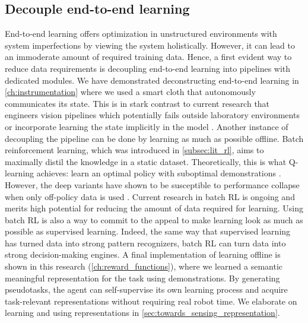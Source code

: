 \documentclass[\home/main.tex]{subfiles}
\begin{document}
\subsection{Decouple end-to-end learning}
End-to-end learning offers optimization in unstructured environments with system imperfections by viewing the system holistically. However, it can lead to an immoderate amount of required training data. Hence, a first evident way to reduce data requirements is decoupling end-to-end learning into pipelines with dedicated modules. 
We have demonstrated deconstructing end-to-end learning in \cref{ch:instrumentation} where we used a smart cloth that autonomously communicates its state. This is in stark contrast to current research that engineers vision pipelines \autocite{Wu2020} which potentially fails outside laboratory environments or incorporate learning the state implicitly in the model \autocite{Matas2018}. 
Another instance of decoupling the pipeline can be done by learning as much as possible offline. Batch reinforcement learning, which was introduced in \cref{subsec:lit_rl}, aims to maximally distil the knowledge in a static dataset. Theoretically, this is what Q-learning achieves: learn an optimal policy with suboptimal demonstrations \autocite{Sutton2018}. However, the deep variants have shown to be susceptible to performance collapse when only off-policy data is used \autocite{hausknecht2016policy}. Current research in batch RL is ongoing and merits high potential for reducing the amount of data required for learning. Using batch RL is also a way to commit to the appeal to make learning look as much as possible as supervised learning. Indeed, the same way that supervised learning has turned data into strong pattern recognizers, batch RL can turn data into strong decision-making engines. 
A final implementation of learning offline is shown in this research (\cref{ch:reward_functions}), where we learned a semantic meaningful representation for the task using demonstrations. By generating pseudotasks, the agent can self-supervise its own learning process and acquire task-relevant representations without requiring real robot time. We elaborate on learning and using representations in \cref{sec:towards_sensing_representation}. 
\end{document}
